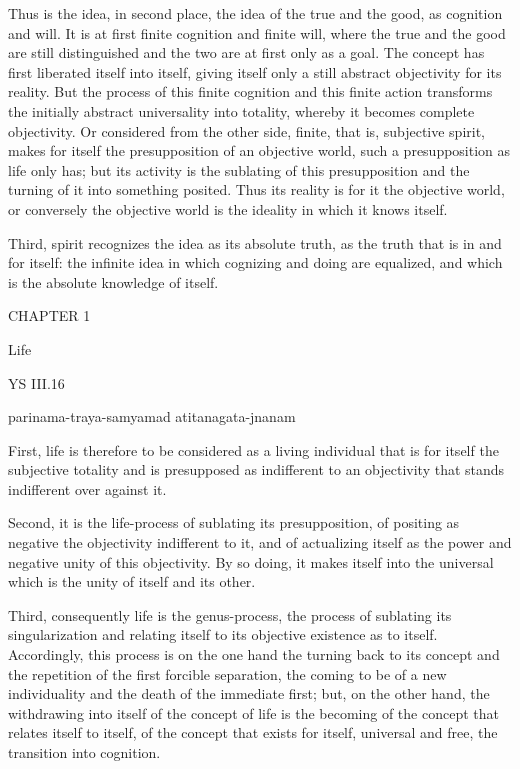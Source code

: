 Thus is the idea, in second place,
the idea of the true and the good,
as cognition and will.
It is at first finite cognition and finite will,
where the true and the good are still distinguished
and the two are at first only as a goal.
The concept has first liberated itself into itself,
giving itself only a still abstract objectivity for its reality.
But the process of this finite cognition and this finite action
transforms the initially abstract universality into totality,
whereby it becomes complete objectivity.
Or considered from the other side,
finite, that is, subjective spirit,
makes for itself the
presupposition of an objective world,
such a presupposition as life only has;
but its activity is the sublating of this presupposition
and the turning of it into something posited.
Thus its reality is for it the objective world,
or conversely the objective world is
the ideality in which it knows itself.

Third, spirit recognizes the idea as its absolute truth,
as the truth that is in and for itself:
the infinite idea in which cognizing and doing are equalized,
and which is the absolute knowledge of itself.

CHAPTER 1

Life

YS III.16

    parinama-traya-samyamad atitanagata-jnanam

First, life is therefore to be considered as a living individual
that is for itself the subjective totality
and is presupposed as indifferent to an objectivity
that stands indifferent over against it.

Second, it is the life-process of sublating its presupposition,
of positing as negative the objectivity indifferent to it,
and of actualizing itself as the power
and negative unity of this objectivity.
By so doing, it makes itself into the universal
which is the unity of itself and its other.

Third, consequently life is the genus-process,
the process of sublating its singularization
and relating itself to its objective existence
as to itself.
Accordingly, this process is
on the one hand the turning back to its concept
and the repetition of the first forcible separation,
the coming to be of a new individuality
and the death of the immediate first;
but, on the other hand, the withdrawing into itself
of the concept of life is the becoming of
the concept that relates itself to itself,
of the concept that exists for itself,
universal and free, the transition into cognition.

